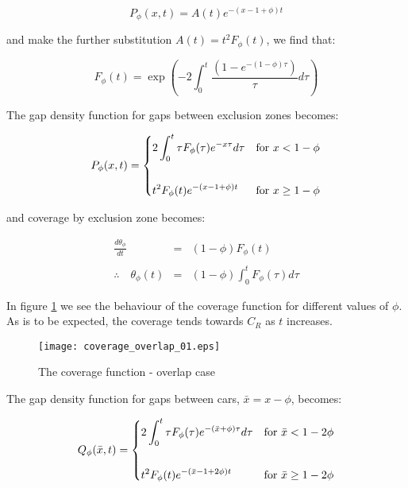 \[
	P_{\phi}(x, t) = A(t) e^{-(x - 1 + \phi)t}
\]\medskip 

and make the further substitution $A(t) = t^2 F_{\phi}(t)$, we find that: \bigskip

\[
	F_{\phi}(t) = \exp \left( -2 \int_{0}^{t} \frac{(1 - e^{-(1 - \phi)\tau})}{\tau} d\tau \right)
\]\medskip

The gap density function for gaps between exclusion zones becomes: \bigskip

\begin{eqnarray*}
	P_{\phi}(x, t) = 
	\begin{dcases}
		2 \int_{0}^{t} \tau F_{\phi}(\tau) e^{-x\tau} d\tau		& \text{for } x < 1 - \phi \\\\
		t^2 F_{\phi}(t) e^{-(x - 1 + \phi)t}					& \text{for } x \geq 1 - \phi 
	\end{dcases}
\end{eqnarray*}\medskip

and coverage by exclusion zone becomes: \bigskip

\begin{eqnarray*}
			\frac{d \theta_{\phi}}{dt} & = & (1 - \phi) F_{\phi}(t) \\\\
	 \therefore \quad \theta_{\phi}(t) & = & (1 - \phi) \int_{0}^{t} F_{\phi}(\tau) d\tau
\end{eqnarray*}\medskip

In figure \ref{fig:cfo1} we see the behaviour of the coverage function for 
different values of $\phi$. As is to be expected, the coverage tends towards 
$C_{R}$ as $t$ increases. \bigskip

\begin{figure}[h!]
	\centering
	\texttt{[image: coverage\_overlap\_01.eps]}
	\caption{The coverage function - overlap case}
	\label{fig:cfo1}
\end{figure}\medskip

The gap density function for gaps between cars, $\bar{x} = x - \phi$,  becomes: \bigskip

\begin{eqnarray*}
	Q_{\phi}(\bar{x}, t) = 
	\begin{dcases}
		2 \int_{0}^{t} \tau F_{\phi}(\tau) e^{-(\bar{x} + \phi)\tau} d\tau			& \text{for } \bar{x} < 1 - 2 \phi \\\\
		t^2 F_{\phi}(t) e^{-(\bar{x} - 1 + 2 \phi)t}								& \text{for } \bar{x} \geq 1 - 2 \phi 
	\end{dcases}
\end{eqnarray*}\medskip

